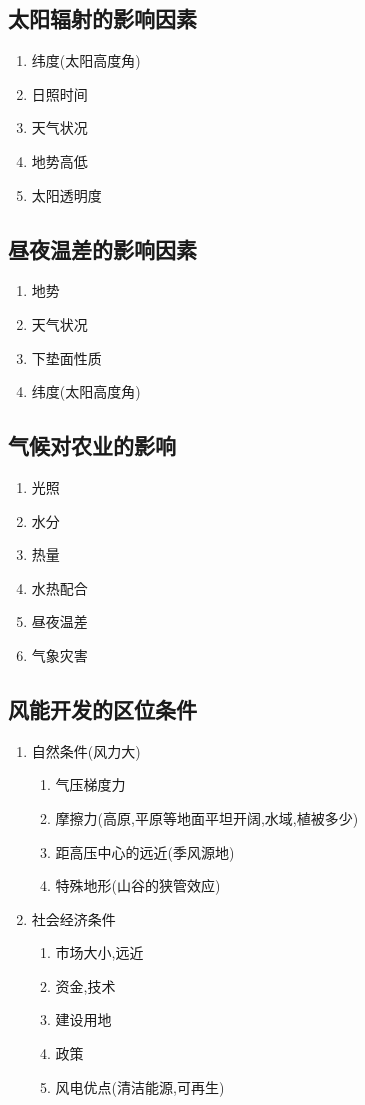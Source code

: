 \documentclass[a4paper]{article}
\begin{document}
    \subsection{太阳辐射的影响因素}
    \begin{enumerate}
        \item 纬度(太阳高度角)
        \item 日照时间
        \item 天气状况
        \item 地势高低
        \item 太阳透明度
    \end{enumerate}
    \subsection{昼夜温差的影响因素}
    \begin{enumerate}
        \item 地势
        \item 天气状况
        \item 下垫面性质
        \item 纬度(太阳高度角)
    \end{enumerate}
    \subsection{气候对农业的影响}
    \begin{enumerate}
        \item 光照
        \item 水分
        \item 热量
        \item 水热配合
        \item 昼夜温差
        \item 气象灾害
    \end{enumerate}
    \subsection{风能开发的区位条件}
    \begin{enumerate}
        \item 自然条件(风力大)
        \begin{enumerate}
            \item 气压梯度力
            \item 摩擦力(高原,平原等地面平坦开阔,水域,植被多少)
            \item 距高压中心的远近(季风源地)
            \item 特殊地形(山谷的狭管效应)
        \end{enumerate}
        \item 社会经济条件
        \begin{enumerate}
            \item 市场大小,远近
            \item 资金,技术
            \item 建设用地
            \item 政策
            \item 风电优点(清洁能源,可再生)
        \end{enumerate}
    \end{enumerate}
\end{document}
